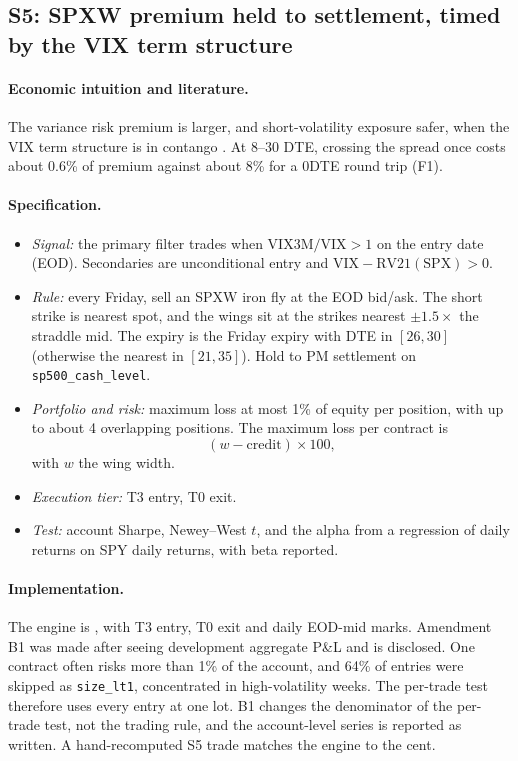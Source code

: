 \documentclass[../main.tex]{subfiles}
\begin{document}
\subsection{S5: SPXW premium held to settlement, timed by the VIX term structure}\label{sec:s5}

\paragraph{Economic intuition and literature.}
The variance risk premium is larger, and short-volatility exposure safer, when the VIX term structure is in contango \citep{carr2009,bollerslev2009,johnson2017}. At 8--30 DTE, crossing the spread once costs about 0.6\% of premium against about 8\% for a 0DTE round trip (F1).

\paragraph{Specification.}
\begin{itemize}
\item \emph{Signal:} the primary filter trades when $\mathrm{VIX3M}/\mathrm{VIX} > 1$ on the entry date (EOD). Secondaries are unconditional entry and $\mathrm{VIX} - \mathrm{RV21}(\mathrm{SPX}) > 0$.
\item \emph{Rule:} every Friday, sell an SPXW iron fly at the EOD bid/ask. The short strike is nearest spot, and the wings sit at the strikes nearest $\pm 1.5 \times$ the straddle mid. The expiry is the Friday expiry with DTE in $[26, 30]$ (otherwise the nearest in $[21, 35]$). Hold to PM settlement on \texttt{sp500\_cash\_level}.
\item \emph{Portfolio and risk:} maximum loss at most 1\% of equity per position, with up to about 4 overlapping positions. The maximum loss per contract is
\begin{equation}
(w - \text{credit}) \times 100,
\end{equation}
with $w$ the wing width.
\item \emph{Execution tier:} T3 entry, T0 exit.
\item \emph{Test:} account Sharpe, Newey--West $t$, and the alpha from a regression of daily returns on SPY daily returns, with beta reported.
\end{itemize}

\paragraph{Implementation.}
The engine is , with T3 entry, T0 exit and daily EOD-mid marks. Amendment B1 was made after seeing development aggregate P\&L and is disclosed. One contract often risks more than 1\% of the account, and 64\% of entries were skipped as \texttt{size\_lt1}, concentrated in high-volatility weeks. The per-trade test therefore uses every entry at one lot. B1 changes the denominator of the per-trade test, not the trading rule, and the account-level series is reported as written. A hand-recomputed S5 trade matches the engine to the cent.
\end{document}
